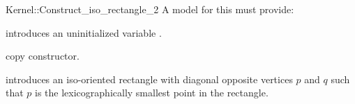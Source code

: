 \begin{ccRefFunctionObjectConcept}{Kernel::Construct_iso_rectangle_2}
A model for this must provide:



\ccHidden {}
             {introduces an uninitialized variable .}

\ccHidden {}
 	    {copy constructor.}

            {introduces an iso-oriented rectangle  with diagonal
             opposite vertices $p$ and $q$ such that $p$ is the
             lexicographically smallest point in the rectangle.}

\end{ccRefFunctionObjectConcept}
